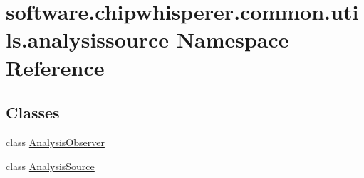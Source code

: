 \hypertarget{namespacesoftware_1_1chipwhisperer_1_1common_1_1utils_1_1analysissource}{}\section{software.\+chipwhisperer.\+common.\+utils.\+analysissource Namespace Reference}
\label{namespacesoftware_1_1chipwhisperer_1_1common_1_1utils_1_1analysissource}
\subsection*{Classes}
\begin{DoxyCompactItemize}
\item 
class \hyperlink{classsoftware_1_1chipwhisperer_1_1common_1_1utils_1_1analysissource_1_1AnalysisObserver}{Analysis\+Observer}
\item 
class \hyperlink{classsoftware_1_1chipwhisperer_1_1common_1_1utils_1_1analysissource_1_1AnalysisSource}{Analysis\+Source}
\end{DoxyCompactItemize}
